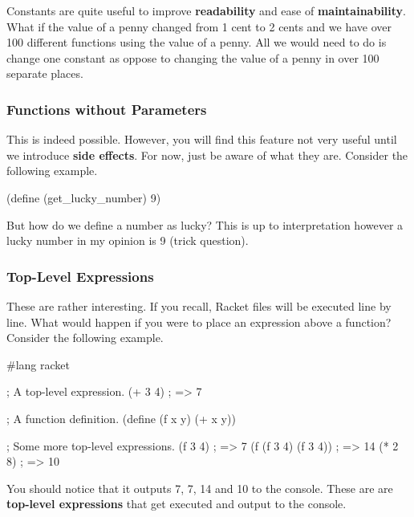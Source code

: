 Constants are quite useful to improve \textbf{readability} and ease of \textbf{maintainability}. What if the value of a penny changed from 1 cent to 2 cents and we have over 100 different functions using the value of a penny. All we would need to do is change one constant as oppose to changing the value of a penny in over 100 separate places.

\subsubsection*{Functions without Parameters}

This is indeed possible. However, you will find this feature not very useful until we introduce \textbf{side effects}. For now, just be aware of what they are. Consider the following example.\\


\begin{code}[Lisp]
(define (get_lucky_number)
	9)
\end{code}

But how do we define a number as lucky? This is up to interpretation however a lucky number in my opinion is 9 (trick question).

\subsubsection*{Top-Level Expressions}

These are rather interesting. If you recall, Racket files will be executed line by line. What would happen if you were to place an expression above a function? Consider the following example.\\


\begin{code}[Lisp]
#lang racket

; A top-level expression.
(+ 3 4) ; => 7

; A function definition.
(define (f x y)
	(+ x y))

; Some more top-level expressions.
(f 3 4) ; => 7
(f (f 3 4) (f 3 4)) ; => 14
(* 2 8) ; => 10
\end{code}

You should notice that it outputs 7, 7, 14 and 10 to the console. These are are \textbf{top-level expressions} that get executed and output to the console.


